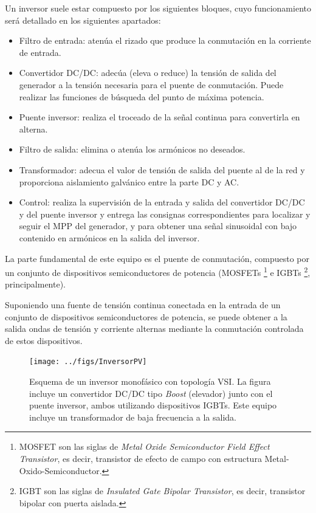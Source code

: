 Un inversor suele estar compuesto por los siguientes bloques, cuyo
funcionamiento será detallado en los siguientes apartados: 
\begin{itemize}
\item Filtro de entrada: atenúa el rizado que produce la conmutación en
la corriente de entrada.
\item Convertidor DC/DC: adecúa (eleva o reduce) la tensión de salida del
generador a la tensión necesaria para el puente de conmutación. Puede
realizar las funciones de búsqueda del punto de máxima potencia.
\item Puente inversor: realiza el troceado de la señal continua para
convertirla en alterna.
\item Filtro de salida: elimina o atenúa los armónicos no deseados.
\item Transformador: adecua el valor de tensión de salida del puente al
de la red y proporciona aislamiento galvánico entre la parte DC y
AC.
\item Control: realiza la supervisión de la entrada y salida del convertidor
DC/DC y del puente inversor y entrega las consignas correspondientes
para localizar y seguir el MPP del generador, y para obtener una señal
sinusoidal con bajo contenido en armónicos en la salida del inversor.
\end{itemize}
La parte fundamental de este equipo es el puente de conmutación, compuesto
por un conjunto de dispositivos semiconductores de potencia (MOSFETs%
\footnote{MOSFET son las siglas de \emph{Metal Oxide Semiconductor Field Effect
Transistor}, es decir, transistor de efecto de campo con estructura
Metal-Oxido-Semiconductor.%
} e IGBTs%
\footnote{IGBT son las siglas de \emph{Insulated Gate Bipolar Transistor}, es
decir, transistor bipolar con puerta aislada. %
}, principalmente).

Suponiendo una fuente de tensión continua conectada en la entrada
de un conjunto de dispositivos semiconductores de potencia, se puede
obtener a la salida ondas de tensión y corriente alternas mediante
la conmutación controlada de estos dispositivos. 

%
\begin{figure}


\texttt{[image: ../figs/InversorPV]}

\caption[Esquema de un inversor monofásico con topología VSI]{\label{fig:InversorMonofasicoVSI}Esquema de un inversor monofásico
con topología VSI. La figura incluye un convertidor DC/DC tipo \emph{Boost}
(elevador) junto con el puente inversor, ambos utilizando dispositivos
IGBTs. Este equipo incluye un transformador de baja frecuencia a la
salida.}

\end{figure}


